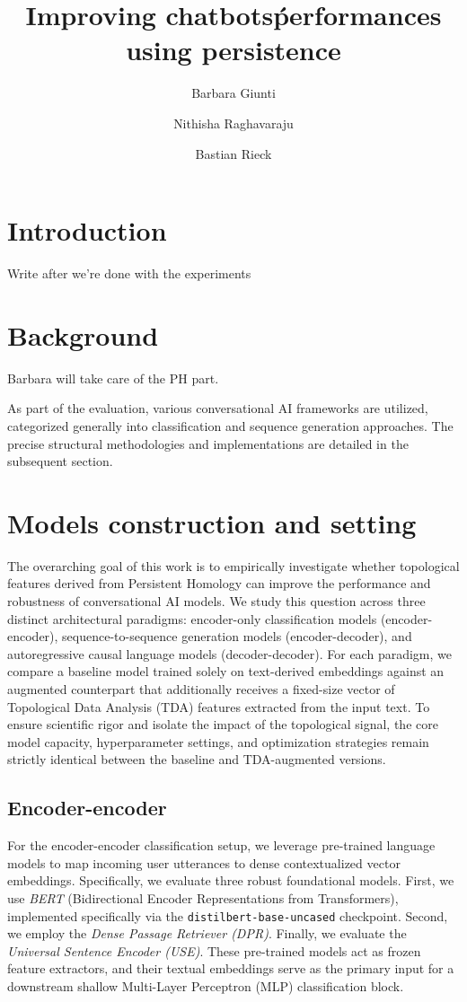 \documentclass{article}
\title{Improving chatbots\' performances using persistence}
\author{Barbara Giunti \and Nithisha Raghavaraju \and Bastian Rieck}
\date{ }
\begin{document}
\maketitle

\section{Introduction}\label{sec_intro}

Write after we're done with the experiments

\section{Background}\label{sec_background}

Barbara will take care of the PH part. 

As part of the evaluation, various conversational AI frameworks are utilized, categorized generally into classification and sequence generation approaches. The precise structural methodologies and implementations are detailed in the subsequent section.

\section{Models construction and setting}

The overarching goal of this work is to empirically investigate whether topological features derived from Persistent Homology can improve the performance and robustness of conversational AI models. We study this question across three distinct architectural paradigms: encoder-only classification models (encoder-encoder), sequence-to-sequence generation models (encoder-decoder), and autoregressive causal language models (decoder-decoder). For each paradigm, we compare a baseline model trained solely on text-derived embeddings against an augmented counterpart that additionally receives a fixed-size vector of Topological Data Analysis (TDA) features extracted from the input text. To ensure scientific rigor and isolate the impact of the topological signal, the core model capacity, hyperparameter settings, and optimization strategies remain strictly identical between the baseline and TDA-augmented versions.

\subsection{Encoder-encoder}

For the encoder-encoder classification setup, we leverage pre-trained language models to map incoming user utterances to dense contextualized vector embeddings. Specifically, we evaluate three robust foundational models. First, we use \emph{BERT} (Bidirectional Encoder Representations from Transformers), implemented specifically via the \texttt{distilbert-base-uncased} checkpoint. Second, we employ the \emph{Dense Passage Retriever (DPR)}. Finally, we evaluate the \emph{Universal Sentence Encoder (USE)}. These pre-trained models act as frozen feature extractors, and their textual embeddings serve as the primary input for a downstream shallow Multi-Layer Perceptron (MLP) classification block.
\end{document}
